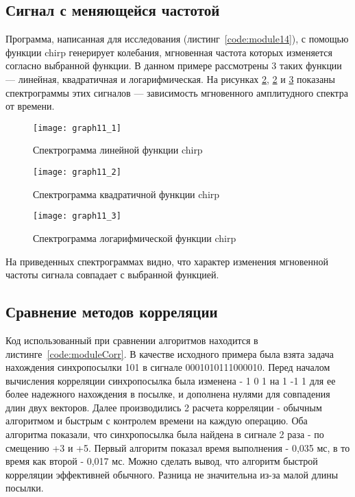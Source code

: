 \subsection{Сигнал с меняющейся частотой}

Программа, написанная для исследования (листинг~\ref{code:module14}), с помощью функции chirp генерирует колебания, мгновенная частота которых изменяется согласно выбранной функции. В данном примере рассмотрены 3 таких функции — линейная, квадратичная и логарифмическая. На рисунках \ref{pic:graph11_2}, \ref{pic:graph11_2} и \ref{pic:graph11_3} показаны спектрограммы этих сигналов — зависимость мгновенного амплитудного спектра от времени.

\begin{figure}[H]
	\begin{center}
		\texttt{[image: graph11\_1]}
		\caption{Спектрограмма линейной функции chirp} 
		\label{pic:graph11_1} %
	\end{center}
\end{figure}
\begin{figure}[H]
	\begin{center}
		\texttt{[image: graph11\_2]}
		\caption{Спектрограмма квадратичной функции chirp} 
		\label{pic:graph11_2} %
	\end{center}
\end{figure}
\begin{figure}[H]
	\begin{center}
		\texttt{[image: graph11\_3]}
		\caption{Спектрограмма логарифмической функции chirp} 
		\label{pic:graph11_3} %
	\end{center}
\end{figure}
На приведенных спектрограммах видно, что характер изменения мгновенной частоты сигнала совпадает с выбранной функцией.

\subsection{Сравнение методов корреляции}
Код использованный при сравнении алгоритмов находится в листинге~\ref{code:moduleCorr}.
В качестве исходного примера была взята задача нахождения синхропосылки 101 в сигнале 0001010111000010.
Перед началом вычисления корреляции синхропосылка была изменена - 1 0 1 на 1 -1 1 для ее более надежного нахождения в посылке, и дополнена нулями для совпадения длин двух векторов.
Далее производились 2 расчета корреляции - обычным алгоритмом и быстрым с контролем времени на каждую операцию.
Оба алгоритма показали, что синхропосылка была найдена в сигнале 2 раза - по смещению +3 и +5. 
Первый алгоритм показал время выполнения - 0,035 мс, в то время как второй - 0,017 мс. Можно сделать вывод, что
алгоритм быстрой корреляции эффективней обычного. Разница не значительна из-за малой длины посылки.

